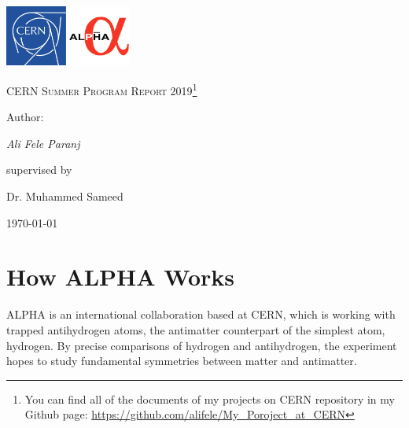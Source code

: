 \documentclass[12pt,a4paper]{article}
\begin{document}
\begin{titlepage}
	\centering
	\includegraphics[width=0.15\textwidth]{cern}\hspace{50mm}
\includegraphics[width=0.15\textwidth]{Alpha}	
	
	\par\vspace{1cm}
	{\scshape\LARGE CERN Summer Program Report 2019\footnote{You can find all of the documents of my projects on CERN repository in my Github page: \url{https://github.com/alifele/My_Poroject_at_CERN}} \par}
	\vspace{1cm}
	
	\vspace{1.5cm}
	
	\vspace{2cm}
	\begin{Large}
	Author:
	\end{Large} \par
	{\Large\itshape Ali Fele Paranj \par}
	\vspace{30mm}
	supervised by\par
	Dr. Muhammed Sameed
	\vfill
	{\large \today\par}

\end{titlepage}



\newpage

\tableofcontents

\newpage

\section{How ALPHA Works}

ALPHA is an international  collaboration based at CERN, which is working with trapped antihydrogen atoms, the antimatter counterpart of the simplest atom, hydrogen. By precise comparisons of hydrogen and antihydrogen, the experiment hopes to study fundamental symmetries between matter and antimatter. 
\end{document}
